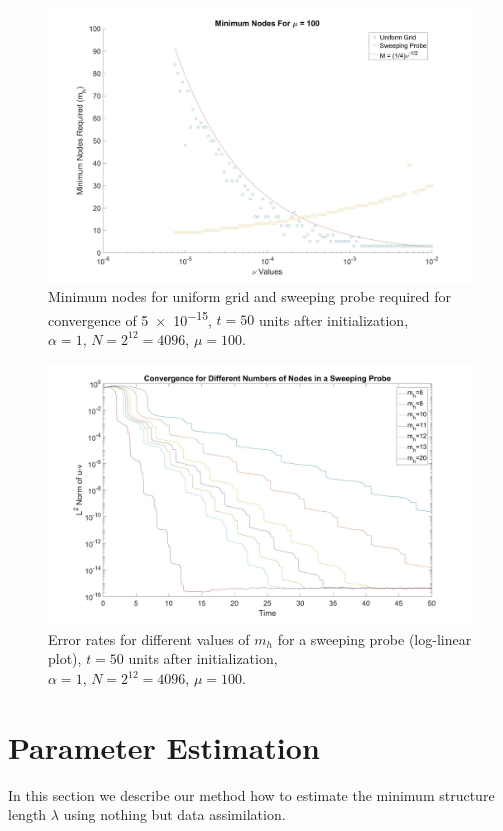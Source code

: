 \documentclass[12pt]{amsart}
\theoremstyle{plain}
\theoremstyle{definition}
\theoremstyle{remark}
\numberwithin{equation}{section} %
\numberwithin{figure}{section}   %
\begin{document}
\begin{figure}
	\includegraphics[scale=0.15]{Minimum}
	\caption{Minimum nodes for uniform grid and sweeping probe required for convergence of \num{5e-15}, $t=50$ units after initialization, \\$\alpha = 1$, $N  =2^{12} = 4096$, $\mu = 100$. }
	\label{fig:min}
\end{figure}
\begin{figure}
	\includegraphics[scale=0.15]{Car_error}
	\caption{Error rates for different values of $m_h$ for a sweeping probe (log-linear plot), $t=50$ units after initialization, \\$\alpha = 1$, $N  =2^{12} = 4096$, $\mu = 100$. }
	\label{fig:CarNodes}
\end{figure}
\section{Parameter Estimation}\label{secNeat1Section}
\noindent
In this section we describe our method how to estimate the minimum structure length $\lambda$ using nothing but data assimilation.
\end{document}
